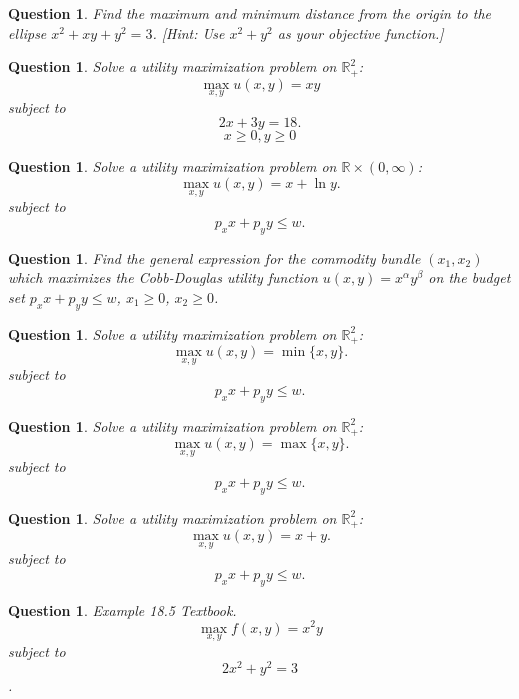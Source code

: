 \documentclass[12pt]{article}
\newtheorem{ques}[theorem]{Question}
\begin{document}
\newpage
\begin{ques}
Find the maximum and minimum distance from the origin to the ellipse $x^2+xy+y^2=3$. [Hint: Use $x^2+y^2$ as your objective function.]
\end{ques}
\newpage
\begin{ques}
Solve a utility maximization problem on $\mathbb{R}_+^2$:
\[\max_{x,y} u(x,y)=xy
\]
subject to 
\[2x+3y=18.\]
\[x\geq 0, y\geq 0
\]
\end{ques}

\newpage

\begin{ques}
Solve a utility maximization problem on $\mathbb{R}\times (0,\infty)$:
\[\max_{x,y} u(x,y)=x+\ln y.
\]
subject to 
\[p_xx+p_yy\leq w.\]
\end{ques}

\newpage
\begin{ques}
Find the general expression for the commodity bundle $(x_1, x_2)$ which maximizes the Cobb-Douglas utility function $u(x,y)=x^\alpha y^\beta$ on the budget set $p_xx+p_yy\leq w$, $x_1\geq 0$, $x_2\geq 0$.
\end{ques}



\newpage
\begin{ques}
Solve a utility maximization problem on $\mathbb{R}_+^2$:
\[\max_{x,y} u(x,y)=\min \{x,y\}.
\]
subject to 
\[p_xx+p_yy\leq w.\]
\end{ques}
\newpage
\begin{ques}
Solve a utility maximization problem on $\mathbb{R}_+^2$:
\[\max_{x,y} u(x,y)=\max \{x,y\}.
\]
subject to 
\[p_xx+p_yy\leq w.\]
\end{ques}
\newpage
\begin{ques}
Solve a utility maximization problem on $\mathbb{R}_+^2$:
\[\max_{x,y} u(x,y)=x+y.
\]
subject to 
\[p_xx+p_yy\leq w.\]
\end{ques}



\newpage
\begin{ques}
Example 18.5 Textbook.
\[\max_{x,y} f(x,y)=x^2y
\]
subject to $$2x^2+y^2=3$$.
\end{ques}
\end{document}
